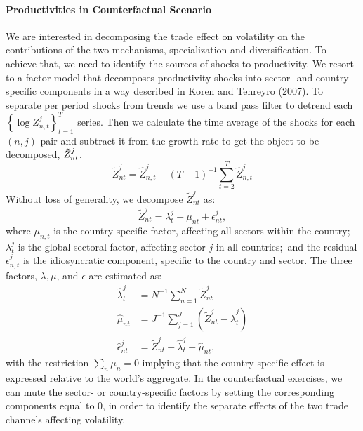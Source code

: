\documentclass[12pt]{article}
\begin{document}
\paragraph{Productivities in Counterfactual Scenario}

We are interested in decomposing the trade effect on volatility on the
contributions of the two mechanisms, specialization and diversification. To
achieve that, we need to identify the sources of shocks to productivity. We
resort to a factor model that decomposes productivity shocks into sector-
and country-specific components in a way described in Koren and Tenreyro
(2007). To separate per period shocks from trends we use a band pass filter
to detrend each $\left\{ \log {Z_{n,t}^{j}}\right\} _{t=1}^{T}$ series. Then
we calculate the time average of the shocks for each $(n,j)$ pair and
subtract it from the growth rate to get the object to be decomposed, $\tilde{%
Z}_{nt}^{j}$. 
\begin{equation*}
\tilde{Z}_{nt}^{j}=\hat{Z}_{n,t}^{j}-(T-1)^{-1}\sum_{t=2}^{T}\hat{Z}%
_{n,t}^{j}
\end{equation*}%
Without loss of generality, we decompose $\tilde{Z}_{nt}^{j}$ as: 
\begin{equation*}
\tilde{Z}_{nt}^{j}=\lambda _{t}^{j}+\mu _{nt}+\epsilon _{nt}^{j},
\end{equation*}%
where ${\mu _{n,t}}$ is the country-specific factor, affecting all sectors
within the country; $\lambda _{t}^{j}$ is the global sectoral factor,
affecting sector $j$ in all countries;\ and the residual $\epsilon
_{n,t}^{j} $ is the idiosyncratic component, specific to the country and
sector. The three factors, $\lambda ,\mu $, and $\epsilon $ are estimated
as: 
\begin{align*}
\hat{\lambda}_{t}^{j}& =N^{-1}\sum_{n=1}^{N}\tilde{Z}_{nt}^{j} \\
\hat{\mu}_{nt}& =J^{-1}\sum_{j=1}^{J}\left( \tilde{Z}_{nt}^{j}-\hat{\lambda}%
_{t}^{j}\right) \\
\hat{\epsilon}_{nt}^{j}& =\tilde{Z}_{nt}^{j}-\hat{\lambda}_{t}^{j}-\hat{\mu}%
_{nt}\text{,}
\end{align*}%
with the restriction $\sum_{n}{\mu _{n}}=0$ implying that the
country-specific effect is expressed relative to the world's aggregate. In
the counterfactual exercises, we can mute the sector- or country-specific
factors by setting the corresponding components equal to 0, in order to
identify the separate effects of the two trade channels affecting
volatility.\bigskip
\end{document}
